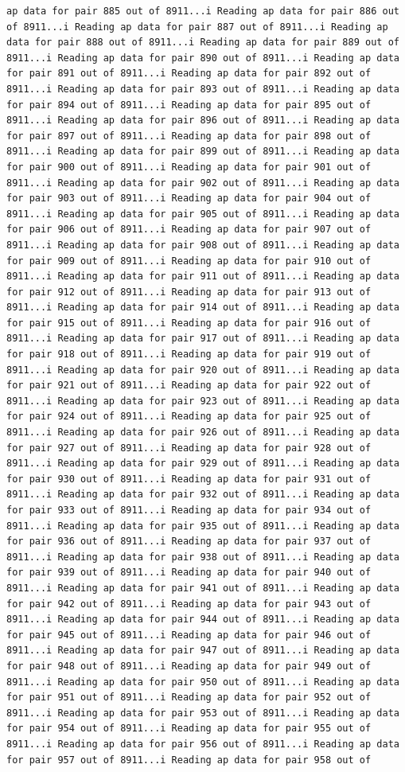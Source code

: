 \documentclass[
]{article}
\begin{document}
\begin{verbatim}
ap data for pair 885 out of 8911...i Reading ap data for pair 886 out of 8911...i Reading ap data for pair 887 out of 8911...i Reading ap data for pair 888 out of 8911...i Reading ap data for pair 889 out of 8911...i Reading ap data for pair 890 out of 8911...i Reading ap data for pair 891 out of 8911...i Reading ap data for pair 892 out of 8911...i Reading ap data for pair 893 out of 8911...i Reading ap data for pair 894 out of 8911...i Reading ap data for pair 895 out of 8911...i Reading ap data for pair 896 out of 8911...i Reading ap data for pair 897 out of 8911...i Reading ap data for pair 898 out of 8911...i Reading ap data for pair 899 out of 8911...i Reading ap data for pair 900 out of 8911...i Reading ap data for pair 901 out of 8911...i Reading ap data for pair 902 out of 8911...i Reading ap data for pair 903 out of 8911...i Reading ap data for pair 904 out of 8911...i Reading ap data for pair 905 out of 8911...i Reading ap data for pair 906 out of 8911...i Reading ap data for pair 907 out of 8911...i Reading ap data for pair 908 out of 8911...i Reading ap data for pair 909 out of 8911...i Reading ap data for pair 910 out of 8911...i Reading ap data for pair 911 out of 8911...i Reading ap data for pair 912 out of 8911...i Reading ap data for pair 913 out of 8911...i Reading ap data for pair 914 out of 8911...i Reading ap data for pair 915 out of 8911...i Reading ap data for pair 916 out of 8911...i Reading ap data for pair 917 out of 8911...i Reading ap data for pair 918 out of 8911...i Reading ap data for pair 919 out of 8911...i Reading ap data for pair 920 out of 8911...i Reading ap data for pair 921 out of 8911...i Reading ap data for pair 922 out of 8911...i Reading ap data for pair 923 out of 8911...i Reading ap data for pair 924 out of 8911...i Reading ap data for pair 925 out of 8911...i Reading ap data for pair 926 out of 8911...i Reading ap data for pair 927 out of 8911...i Reading ap data for pair 928 out of 8911...i Reading ap data for pair 929 out of 8911...i Reading ap data for pair 930 out of 8911...i Reading ap data for pair 931 out of 8911...i Reading ap data for pair 932 out of 8911...i Reading ap data for pair 933 out of 8911...i Reading ap data for pair 934 out of 8911...i Reading ap data for pair 935 out of 8911...i Reading ap data for pair 936 out of 8911...i Reading ap data for pair 937 out of 8911...i Reading ap data for pair 938 out of 8911...i Reading ap data for pair 939 out of 8911...i Reading ap data for pair 940 out of 8911...i Reading ap data for pair 941 out of 8911...i Reading ap data for pair 942 out of 8911...i Reading ap data for pair 943 out of 8911...i Reading ap data for pair 944 out of 8911...i Reading ap data for pair 945 out of 8911...i Reading ap data for pair 946 out of 8911...i Reading ap data for pair 947 out of 8911...i Reading ap data for pair 948 out of 8911...i Reading ap data for pair 949 out of 8911...i Reading ap data for pair 950 out of 8911...i Reading ap data for pair 951 out of 8911...i Reading ap data for pair 952 out of 8911...i Reading ap data for pair 953 out of 8911...i Reading ap data for pair 954 out of 8911...i Reading ap data for pair 955 out of 8911...i Reading ap data for pair 956 out of 8911...i Reading ap data for pair 957 out of 8911...i Reading ap data for pair 958 out of 
\end{verbatim}
\end{document}
